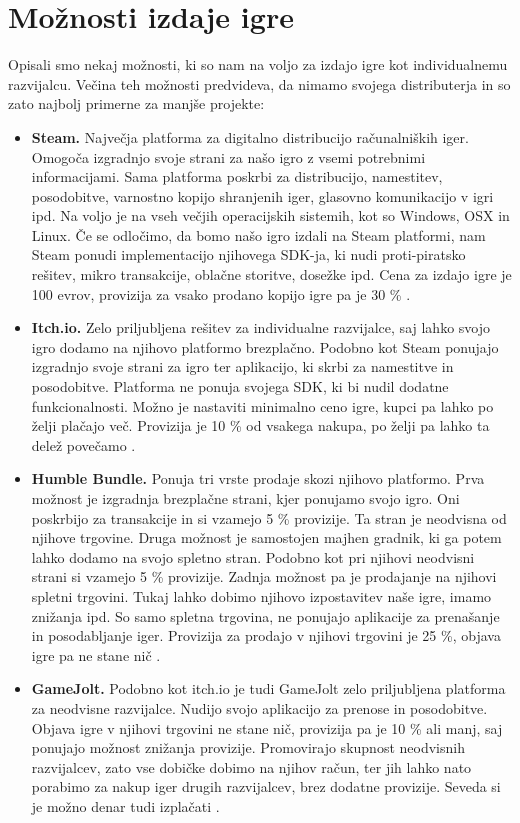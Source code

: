 \documentclass[12pt,a4paper,twoside]{book}
\begin{document}
\section{Možnosti izdaje igre}
Opisali smo nekaj možnosti, ki so nam na voljo za izdajo igre kot individualnemu razvijalcu. Večina teh možnosti predvideva, da nimamo svojega distributerja in so zato najbolj primerne za manjše projekte:
\begin{itemize}
	\item \textbf{Steam.} Največja platforma za digitalno distribucijo računalniških iger. Omogoča izgradnjo svoje strani za našo igro z vsemi potrebnimi informacijami. Sama platforma poskrbi za distribucijo, namestitev, posodobitve, varnostno kopijo shranjenih iger, glasovno komunikacijo v igri ipd. Na voljo je na vseh večjih operacijskih sistemih, kot so Windows, OSX in Linux. Če se odločimo, da bomo našo igro izdali na Steam platformi, nam Steam ponudi implementacijo njihovega SDK-ja, ki nudi proti-piratsko rešitev, mikro transakcije, oblačne storitve, dosežke ipd. Cena za izdajo igre je 100 evrov, provizija za vsako prodano kopijo igre pa je 30 \% \cite{steam}.
	\item \textbf{Itch.io.} Zelo priljubljena rešitev za individualne razvijalce, saj lahko svojo igro dodamo na njihovo platformo brezplačno. Podobno kot Steam ponujajo izgradnjo svoje strani za igro ter aplikacijo, ki skrbi za namestitve in posodobitve. Platforma ne ponuja svojega SDK, ki bi nudil dodatne funkcionalnosti. Možno je nastaviti minimalno ceno igre, kupci pa lahko po želji plačajo več. Provizija je 10 \% od vsakega nakupa, po želji pa lahko ta delež povečamo \cite{itchiofaq}.
	\item \textbf{Humble Bundle.} Ponuja tri vrste prodaje skozi njihovo platformo. Prva možnost je izgradnja brezplačne strani, kjer ponujamo svojo igro. Oni poskrbijo za transakcije in si vzamejo 5 \% provizije. Ta stran je neodvisna od njihove trgovine. Druga možnost je samostojen majhen gradnik, ki ga potem lahko dodamo na svojo spletno stran. Podobno kot pri njihovi neodvisni strani si vzamejo 5 \% provizije. Zadnja možnost pa je prodajanje na njihovi spletni trgovini. Tukaj lahko dobimo njihovo izpostavitev naše igre, imamo znižanja ipd. So samo spletna trgovina, ne ponujajo aplikacije za prenašanje in posodabljanje iger. Provizija za prodajo v njihovi trgovini je 25 \%, objava igre pa ne stane nič \cite{humblebundle}.
	\item \textbf{GameJolt.} Podobno kot itch.io je tudi GameJolt zelo priljubljena platforma za neodvisne razvijalce. Nudijo svojo aplikacijo za prenose in posodobitve. Objava igre v njihovi trgovini ne stane nič, provizija pa je 10 \% ali manj, saj ponujajo možnost znižanja provizije. Promovirajo skupnost neodvisnih razvijalcev, zato vse dobičke dobimo na njihov račun, ter jih lahko nato porabimo za nakup iger drugih razvijalcev, brez dodatne provizije. Seveda si je možno denar tudi izplačati \cite{gamejolt}.

\end{itemize}
\end{document}
